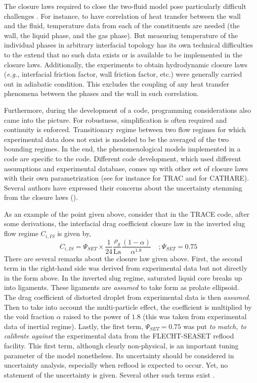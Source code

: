 \documentclass[11pt,titlepage]{article}
\begin{document}
The closure laws required to close the two-fluid model pose particularly difficult challenges \cite{Wulff2007}. 
For instance, to have correlation of heat transfer between the wall and the fluid, temperature data from each of the constituents are needed (the wall, the liquid phase, and the gas phase). 
But measuring temperature of the individual phases in arbitrary interfacial topology has its own technical difficulties to the extend that no such data exists or is available to be implemented in the closure laws.
Additionally, the experiments to obtain hydrodynamic closure laws (\textit{e.g.,} interfacial friction factor, wall friction factor, etc.) were generally carried out in adiabatic condition. 
This excludes the coupling of any heat transfer phenomena between the phases and the wall in such correlation. 

Furthermore, during the development of a code, programming considerations also came into the picture. 
For robustness, simplification is often required and continuity is enforced. 
Transitionary regime between two flow regimes for which experimental data does not exist is modeled to be the averaged of the two bounding regimes. 
In the end, the phenomenological models implemented in a code are specific to the code. 
Different code development, which used different assumptions and experimental database, comes up with other set of closure laws with their own parametrization (see for instance \cite{Nelson1992} for TRAC and \cite{Bestion1990} for CATHARE). 
Several authors have expressed their concerns about the uncertainty stemming from the closure laws (\cite{Wulff2007, DAuria2012, Petruzzi2008}).

As an example of the point given above, consider that in the TRACE code, after some derivations, the interfacial drag coefficient closure law in the inverted slug flow regime $C_{i,IS}$ is given by,
\begin{equation}
C_{i,IS} = \Psi_{SET} \times \frac{1}{24}\frac{\rho_g}{\text{La}}\frac{(1-\alpha)}{\alpha^{1.8}} \; \; \; \; ;\Psi_{SET} = 0.75
\end{equation}
There are several remarks about the closure law given above. 
First, the second term in the right-hand side was derived from experimental data but not directly in the form above. 
In the inverted slug regime, saturated liquid core breaks up into ligaments. 
These ligaments are \emph{assumed} to take form as prolate ellipsoid. 
The drag coefficient of distorted droplet from experimental data is then \emph{assumed}. 
Then to take into account the multi-particle effect, the coefficient is multiplied by the void fraction $\alpha$ raised to the power of $1.8$ (this was taken from experimental data of inertial regime). 
Lastly, the first term, $\Psi_{SET} = 0.75$ was put \emph{to match, to calibrate against} the experimental data from the FLECHT-SEASET reflood facility. 
This first term, although clearly non-physical, is an important tuning parameter of the model nonetheless. 
Its uncertainty should be considered in uncertainty analysis, especially when reflood is expected to occur.
Yet, no statement of the uncertainty is given. 
Several other such terms exist \cite{TraceTheory2012}.
\end{document}
